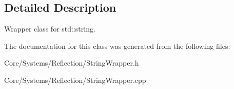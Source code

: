 \subsection{Detailed Description}
Wrapper class for std\-::string. 

The documentation for this class was generated from the following files\-:\begin{DoxyCompactItemize}
\item 
Core/\-Systems/\-Reflection/String\-Wrapper.\-h\item 
Core/\-Systems/\-Reflection/String\-Wrapper.\-cpp\end{DoxyCompactItemize}
